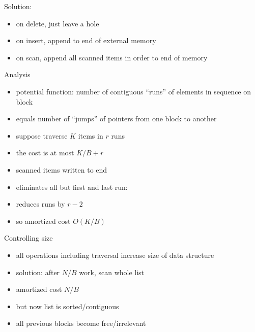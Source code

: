 \documentclass{article}
\begin{document}
Solution:
\begin{itemize}
\item on delete, just leave a hole
\item on insert, append to end of external memory
\item on scan, append all scanned items in order to end of memory
\end{itemize}

Analysis
\begin{itemize}
\item potential function: number of contiguous ``runs'' of elements in
  sequence on block
\item equals number of ``jumps'' of pointers from one block to another
\item suppose traverse $K$ items in $r$ runs
\item the cost is at most $K/B+r$
\item scanned items written to end
\item eliminates all but first and last run: 
\item reduces runs by $r-2$
\item so amortized cost $O(K/B)$
\end{itemize}

Controlling size
\begin{itemize}
\item all operations including traversal increase size of data
  structure
\item solution: after $N/B$ work, scan whole list
\item amortized cost $N/B$
\item but now list is sorted/contiguous
\item all previous blocks become free/irrelevant
\end{itemize}
\end{document}
